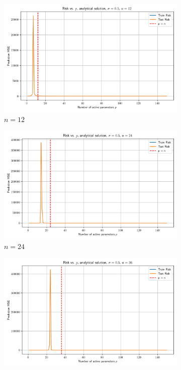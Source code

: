 \documentclass{article}
\begin{document}
\begin{figure}[htb]
  \centering
  \newcommand{\imgwidth}{0.22\textwidth}

  \begin{subfigure}[b]{\imgwidth}
    \includegraphics[width=\linewidth]{img2/risk_curve_n12.png}
    \caption{$n=12$}\label{fig:2a}
  \end{subfigure}%
  \hfill
  \begin{subfigure}[b]{\imgwidth}
    \includegraphics[width=\linewidth]{img2/risk_curve_n24.png}
    \caption{$n=24$}\label{fig:2b}
  \end{subfigure}%
  \hfill
  \begin{subfigure}[b]{\imgwidth}
    \includegraphics[width=\linewidth]{img2/risk_curve_n36.png}

\end{subfigure}
\end{figure}
\end{document}
